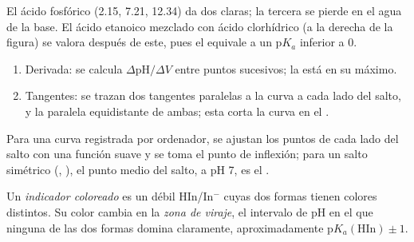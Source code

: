El ácido fosfórico (2.15, 7.21, 12.34) da dos  claras; la
tercera se pierde en el agua de la base. El ácido etanoico mezclado con
ácido clorhídrico (a la derecha de la figura) se valora después de este,
pues el  equivale a un $\mathrm{p}K_a$ inferior a 0.

\begin{method}\label{met:b1:titration-methods:derivative}
\begin{enumerate}
  \item Derivada: se calcula $\Delta\mathrm{pH}/\Delta V$ entre puntos
        sucesivos; la  está en su máximo.
  \item Tangentes: se trazan dos tangentes paralelas a la curva a cada
        lado del salto, y la paralela equidistante de ambas; esta corta
        la curva en el .
\end{enumerate}
\end{method}

\begin{method}\label{met:b1:titration-methods:tangents}
Para una curva registrada por ordenador, se ajustan los puntos de cada
lado del salto con una función suave y se toma el punto de inflexión;
para un salto simétrico (, ), el punto medio del
salto, a pH 7, es el .
\end{method}

\begin{definition}\label{def:b1:titration-methods:indicator}
Un \emph{indicador coloreado} es un  débil HIn/In$^-$ cuyas dos formas tienen colores distintos.
Su color cambia en la \emph{zona de viraje}, el
intervalo de pH en el que ninguna de las dos formas domina claramente,
aproximadamente $\mathrm{p}K_{a}(\mathrm{HIn}) \pm 1$.
\end{definition}


